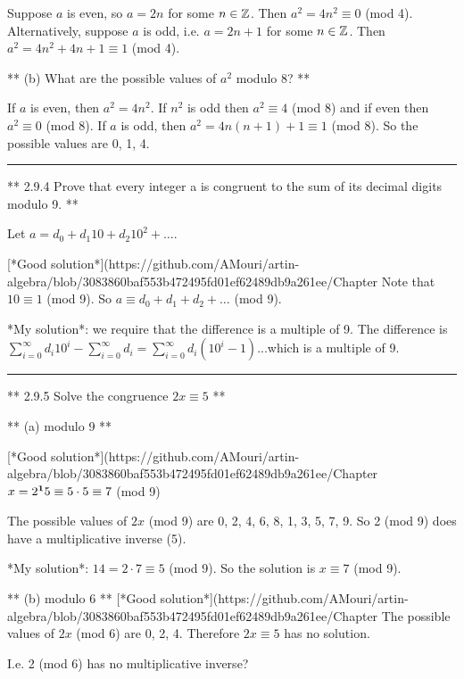 Suppose $a$ is even, so $a = 2n$ for some $n \in \mathbb{Z}$. Then $a^2 = 4n^2 \equiv
0$ (mod 4). Alternatively, suppose $a$ is odd, i.e. $a = 2n + 1$ for some $n
\in \mathbb{Z}$. Then $a^2 = 4n^2 + 4n +1 \equiv 1$ (mod 4).

** (b) What are the possible values of $a^2$ modulo 8? **

If $a$ is even, then $a^2 = 4n^2$. If $n^2$ is odd then $a^2 \equiv 4$ (mod 8)
and if even then $a^2 \equiv 0$ (mod 8). If $a$ is odd, then $a^2 = 4n(n+1) + 1
\equiv 1$ (mod 8). So the possible values are 0, 1, 4.


\hrule

** 2.9.4 Prove that every integer a is congruent to the sum of its decimal
digits modulo 9. **

Let $a = d_0 + d_1 10 + d_2 10^2 + \ldots$.

[*Good solution*](https://github.com/AMouri/artin-algebra/blob/3083860baf553b472495fd01ef62489db9a261ee/Chapter%
Note that $10 \equiv 1$ (mod 9). So $a \equiv d_0 + d_1 + d_2 + \ldots$ (mod 9).

*My solution*: we require that the difference is a multiple of 9. The difference
is $\sum_{i=0}^\infty d_i 10^i - \sum_{i=0}^\infty d_i = \sum_{i=0}^\infty
d_i(10^i - 1)$...which is a multiple of 9.


\hrule

** 2.9.5 Solve the congruence $2x \equiv 5$ **

** (a) modulo 9 **

[*Good solution*](https://github.com/AMouri/artin-algebra/blob/3083860baf553b472495fd01ef62489db9a261ee/Chapter%
$x = 2^{\mathbf 1} 5 \equiv 5 \cdot 5 \equiv 7$ (mod 9)

The possible values of $2x$ (mod 9) are 0, 2, 4, 6, 8, 1, 3, 5, 7, 9. So 2 (mod
9) does have a multiplicative inverse (5).


*My solution*: $14 = 2 \cdot 7 \equiv 5$ (mod 9). So the solution is $x \equiv 7$ (mod 9).

** (b) modulo 6 **
[*Good solution*](https://github.com/AMouri/artin-algebra/blob/3083860baf553b472495fd01ef62489db9a261ee/Chapter%
The possible values of $2x$ (mod 6) are 0, 2, 4. Therefore $2x \equiv 5$ has no
solution.

I.e. 2 (mod 6) has no multiplicative inverse?

